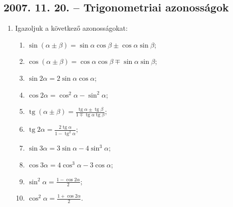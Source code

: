 \documentclass{article}
\newenvironment{abc}{\begin{enumerate}[label=\textit{\alph*})]}{\end{enumerate}}
\newcommand{\tg}{\mathop{\mathrm{tg}}\nolimits}
\begin{document}
\subsection*{2007. 11. 20. -- Trigonometriai azonosságok}
\begin{enumerate}
\item Igazoljuk a következő azonosságokat:
\begin{abc}
\item $\sin(\alpha \pm \beta)=\sin\alpha \cos\beta \pm \cos\alpha \sin\beta$;
\item $\cos(\alpha \pm \beta)=\cos\alpha\cos\beta \mp \sin\alpha\sin\beta$;
\item $\sin 2\alpha=2\sin\alpha\cos\alpha$;
\item $\cos 2\alpha=\cos^2\alpha-\sin^2\alpha$;
\item $\displaystyle{\tg(\alpha \pm \beta)=\frac{\tg\alpha \pm \tg\beta}{1 \mp \tg\alpha\tg\beta}}$;
\item $\displaystyle{\tg 2\alpha=\frac{2\tg\alpha}{1-\tg^2\alpha}}$;
\item $\sin 3\alpha=3\sin\alpha-4\sin^3\alpha$;
\item $\cos 3\alpha=4\cos^3\alpha-3\cos\alpha$;
\item $\displaystyle{\sin^2\alpha=\frac{1-\cos2\alpha}{2}}$;
\item $\displaystyle{\cos^2\alpha=\frac{1+\cos2\alpha}{2}}$.
\end{abc}
\end{enumerate}
\end{document}
